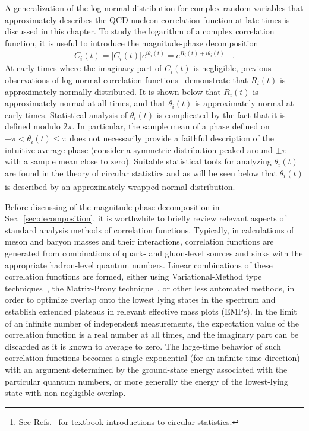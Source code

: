 A generalization of the log-normal distribution for complex random variables that approximately 
describes the QCD nucleon correlation function at late times is discussed in this chapter. 
To study the logarithm of a complex correlation function, it is useful to introduce the magnitude-phase decomposition 
%
\begin{equation}
  \begin{split}
    C_i(t) = |C_i(t)|e^{i\theta_i(t)} = e^{R_i(t) + i\theta_i(t)}
    \ \ \ \ .
  \end{split}\label{RThdef}
\end{equation}
%
At early times where the imaginary part of $C_i(t)$ is negligible, previous observations of log-normal correlation 
functions~\cite{DeGrand:2012ik} demonstrate that $R_i(t)$ is approximately normally distributed. It is shown below that 
$R_i(t)$ is approximately normal at all times, and that $\theta_i(t)$ is approximately normal at early times. 
Statistical analysis of $\theta_i(t)$ is complicated by the fact that it is defined modulo $2\pi$. 
In particular, the sample mean of a phase defined on $-\pi < \theta_i(t) \leq \pi$ does not necessarily provide a faithful 
description of the intuitive average phase (consider a symmetric distribution peaked around 
$\pm\pi$ with a sample mean close to zero). 
Suitable statistical tools for analyzing $\theta_i(t)$ are found in the theory of circular statistics and as will 
be seen below that $\theta_i(t)$ is described by an approximately wrapped normal distribution.~\footnote{
See Refs.~\cite{Fisher:1995,Borradaile:2003,Mardia:2009} for 
textbook introductions to circular statistics.
} 

Before discussing of the magnitude-phase decomposition in Sec.~\ref{sec:decomposition},
it is worthwhile to briefly review relevant aspects of standard analysis methods of correlation functions.
Typically, in calculations of meson and baryon masses and  their interactions, 
 correlation functions are generated  from combinations of quark- and gluon-level  
sources and sinks with the appropriate hadron-level quantum numbers.  
Linear combinations of these correlation functions are formed, 
either using Variational-Method type techniques~\cite{Luscher:1990ck}, 
the Matrix-Prony technique~\cite{Beane:2009kya},
or other less automated methods,
in order to optimize overlap onto the lowest lying states in the spectrum 
and establish extended plateaus in 
relevant effective mass plots (EMPs).
In the limit of an infinite number of independent measurements, 
the expectation value of the correlation function is a real number at all times, and 
the imaginary part can be discarded as it is known to average to zero. 
The large-time behavior of such correlation functions 
becomes a single exponential (for an infinite time-direction) with an argument determined by the ground-state energy associated with the particular quantum numbers, or more generally the energy of the lowest-lying state with non-negligible overlap.

